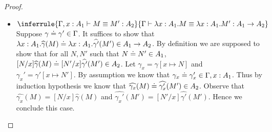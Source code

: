 \documentclass{article}
\newcommand{\G}{\Gamma}
\newcommand{\entails}{\vdash}
\newcommand{\eabs}[3]{\lambda #1:#2.#3}
\begin{document}
\begin{proof}
\begin{itemize}
    \item $\inferrule{ \G,x:A_1 \entails M \equiv M' : A_2 }{ \G \entails \eabs{x}{A_1}{M} \equiv \eabs{x}{A_1}{M'} : A_1 \to A_2 }$\\
    Suppose $\gamma \eeq \gamma' \in \G$.
    It suffices to show that $\eabs{x}{A_1}{\widehat{\gamma}(M)} \eeq \eabs{x}{A_1}{\widehat{\gamma'}(M')} \in A_1 \to A_2$.
    By definition we are supposed to show that for all $N,N'$ such that $N \doteq N' \in A_1$, $[N/x]\widehat{\gamma}(M) \doteq [N'/x]\widehat{\gamma'}(M') \in A_2$.
    Let $\gamma_x = \gamma[x \mapsto N]$ and $\gamma_x' = \gamma'[x \mapsto N']$.
    By assumption we know that $\gamma_x \eeq \gamma_x' \in \G,x:A_1$.
    Thus by induction hypothesis we know that $\widehat{\gamma_x}(M) \doteq \widehat{\gamma_x'}(M') \in A_2$.
    Observe that $\widehat{\gamma_x}(M) = [N/x]\widehat{\gamma}(M)$ and $\widehat{\gamma_x'}(M') = [N'/x]\widehat{\gamma'}(M')$.
    Hence we conclude this case.
    

\end{itemize}
\end{proof}
\end{document}
